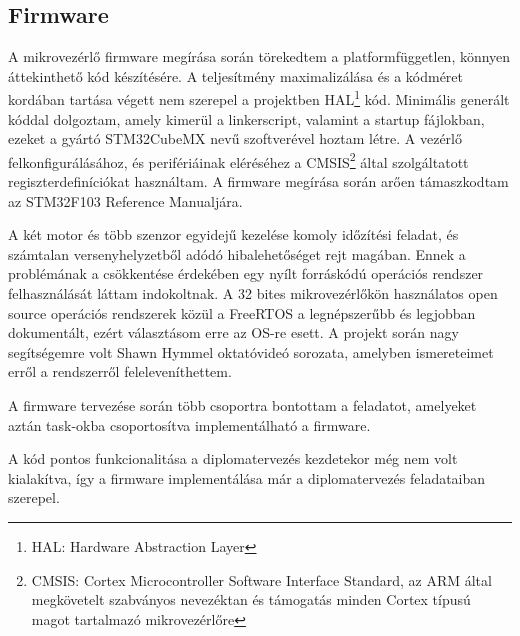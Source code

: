 
\subsection{Firmware}

A mikrovezérlő firmware megírása során törekedtem a platformfüggetlen, könnyen áttekinthető kód készítésére. A teljesítmény maximalizálása és a kódméret kordában tartása végett nem szerepel a projektben
HAL\footnote{HAL: Hardware Abstraction Layer} kód. Minimális generált kóddal dolgoztam, amely kimerül a linkerscript, valamint a startup fájlokban, ezeket a gyártó STM32CubeMX nevű szoftverével hoztam létre. A vezérlő
felkonfigurálásához, és perifériáinak eléréséhez a CMSIS\footnote{CMSIS: Cortex Microcontroller Software Interface Standard, az ARM által megkövetelt szabványos nevezéktan és támogatás minden Cortex típusú magot tartalmazó
mikrovezérlőre} által szolgáltatott regiszterdefiníciókat használtam. A firmware megírása során arően támaszkodtam az STM32F103 Reference Manualjára.

A két motor és több szenzor egyidejű kezelése komoly időzítési feladat, és számtalan versenyhelyzetből adódó hibalehetőséget rejt magában. Ennek a problémának a csökkentése érdekében egy nyílt forráskódú operációs rendszer
felhasználását láttam indokoltnak. A 32 bites mikrovezérlőkön használatos open source operációs rendszerek közül a FreeRTOS a legnépszerűbb és legjobban dokumentált, ezért választásom erre az
OS-re esett. A projekt során nagy segítségemre volt Shawn Hymmel oktatóvideó sorozata, amelyben ismereteimet erről a rendszerről feleleveníthettem. 

A firmware tervezése során több csoportra bontottam a feladatot, amelyeket aztán task-okba csoportosítva implementálható a firmware.


A kód pontos funkcionalitása a diplomatervezés kezdetekor még nem volt kialakítva, így a firmware implementálása már a diplomatervezés feladataiban szerepel.

